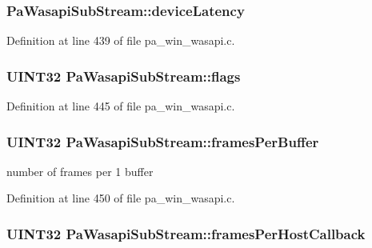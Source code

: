 \subsubsection[{\texorpdfstring{device\+Latency}{deviceLatency}}]{ Pa\+Wasapi\+Sub\+Stream\+::device\+Latency}\hypertarget{struct_pa_wasapi_sub_stream_a06ef93d9ac069dea0fef0c40ff4b8c76}{}\label{struct_pa_wasapi_sub_stream_a06ef93d9ac069dea0fef0c40ff4b8c76}


Definition at line 439 of file pa\+\_\+win\+\_\+wasapi.\+c.

\subsubsection[{\texorpdfstring{flags}{flags}}]{\setlength{\rightskip}{0pt plus 5cm}U\+I\+N\+T32 Pa\+Wasapi\+Sub\+Stream\+::flags}\hypertarget{struct_pa_wasapi_sub_stream_a0a614eb0d553c247fc55888c5a978b90}{}\label{struct_pa_wasapi_sub_stream_a0a614eb0d553c247fc55888c5a978b90}


Definition at line 445 of file pa\+\_\+win\+\_\+wasapi.\+c.

\subsubsection[{\texorpdfstring{frames\+Per\+Buffer}{framesPerBuffer}}]{\setlength{\rightskip}{0pt plus 5cm}U\+I\+N\+T32 Pa\+Wasapi\+Sub\+Stream\+::frames\+Per\+Buffer}\hypertarget{struct_pa_wasapi_sub_stream_a49cb0fd8c4261d2ac381cb27311de59b}{}\label{struct_pa_wasapi_sub_stream_a49cb0fd8c4261d2ac381cb27311de59b}


number of frames per 1 buffer 



Definition at line 450 of file pa\+\_\+win\+\_\+wasapi.\+c.

\subsubsection[{\texorpdfstring{frames\+Per\+Host\+Callback}{framesPerHostCallback}}]{\setlength{\rightskip}{0pt plus 5cm}U\+I\+N\+T32 Pa\+Wasapi\+Sub\+Stream\+::frames\+Per\+Host\+Callback}\hypertarget{struct_pa_wasapi_sub_stream_ae1b80bba3ceb65c33e96962755839868}{}\label{struct_pa_wasapi_sub_stream_ae1b80bba3ceb65c33e96962755839868}


